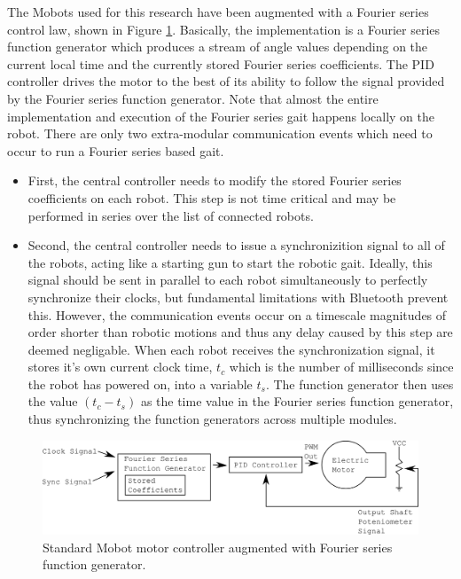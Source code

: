  The Mobots used for this research have been augmented with a Fourier series
    control law, shown in Figure \ref{fig:motor_controller_architecture}.
  Basically, the implementation is a Fourier series function generator which
    produces a stream of angle values depending on the current local time and the 
    currently stored Fourier series coefficients.
  The PID controller drives the motor to the best of its ability to follow 
    the signal provided by the Fourier series function generator.
  Note that almost the entire implementation and execution of the Fourier series
    gait happens locally on the robot.
  There are only two extra-modular communication events which need to occur to 
    run a Fourier series based gait.
    \begin{itemize}
      \item First, the central controller needs to modify the stored Fourier series 
        coefficients on each robot. This step is not time critical and may be 
        performed in series over the list of connected robots.
      \item Second, the central controller needs to issue a synchronizition
        signal to all of the robots, acting like a starting gun to start the
        robotic gait. Ideally, this signal should be sent in parallel to each
        robot simultaneously to perfectly synchronize their clocks, but 
        fundamental limitations with Bluetooth prevent this. However,
        the communication events occur on a timescale magnitudes of order
        shorter than robotic motions and thus any delay caused by this step
        are deemed negligable. When each robot receives the synchronization
        signal, it stores it's own current clock time, $t_c$ which is the
        number of milliseconds since the robot has powered on, into a 
        variable $t_s$. The function generator then uses the value
        $(t_c - t_s)$ as the time value in the Fourier series function generator,
        thus synchronizing the function generators across multiple modules.
    \end{itemize}
  
  \begin{figure}[!ht]
  \begin{center}
     \includegraphics[width=5in]{figures/motor_controller_architecture}
  \end{center}
  \caption{\label{fig:motor_controller_architecture}Standard Mobot
  motor controller augmented with Fourier series function generator.}
  \end{figure}

